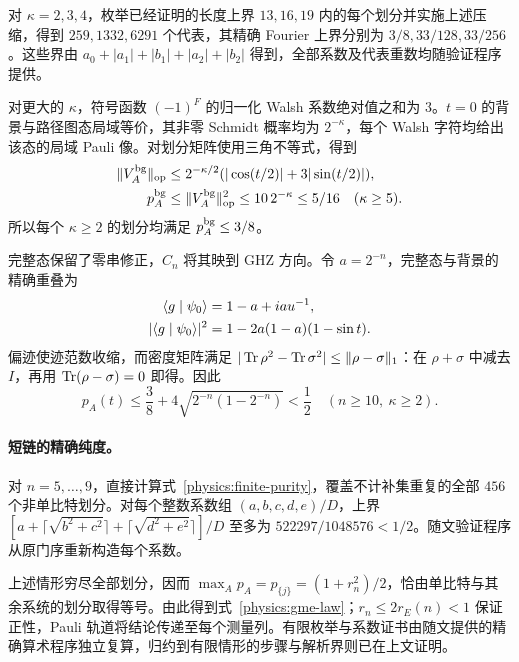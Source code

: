 对 $\kappa=2,3,4$，枚举已经证明的长度上界 $13,16,19$ 内的每个划分并实施上述压缩，得到 $259,1332,6291$ 个代表，其精确 Fourier 上界分别为 $3/8,33/128,33/256$。这些界由 $a_0+|a_1|+|b_1|+|a_2|+|b_2|$ 得到，全部系数及代表重数均随验证程序提供。

对更大的 $\kappa$，符号函数 $(-1)^F$ 的归一化 Walsh 系数绝对值之和为 $3$。$t=0$ 的背景与路径图态局域等价，其非零 Schmidt 概率均为 $2^{-\kappa}$，每个 Walsh 字符均给出该态的局域 Pauli 像。对划分矩阵使用三角不等式，得到
\begin{equation}
 \begin{aligned}
 \|V_A^{\rm bg}\|_{\rm op}
 &\le2^{-\kappa/2}(|\cos(t/2)|+3|\sin(t/2)|),\\
 p_A^{\rm bg}&\le\|V_A^{\rm bg}\|_{\rm op}^2
 \le10\,2^{-\kappa}\le5/16\quad(\kappa\ge5).
 \end{aligned}
 \label{physics:walsh-purity-bound}
\end{equation}
所以每个 $\kappa\ge2$ 的划分均满足 $p_A^{\rm bg}\le3/8$。

完整态保留了零串修正，$C_n$ 将其映到 GHZ 方向。令 $a=2^{-n}$，完整态与背景的精确重叠为
\begin{equation}
 \begin{aligned}
 \langle g\mid \psi_0\rangle&=1-a+iau^{-1},\\
 |\langle g\mid \psi_0\rangle|^2&=1-2a(1-a)(1-\sin t).
 \end{aligned}
 \label{physics:background-overlap}
\end{equation}
偏迹使迹范数收缩，而密度矩阵满足 $|\operatorname{Tr}\rho^2-\operatorname{Tr}\sigma^2|\le\|\rho-\sigma\|_1$：在 $\rho+\sigma$ 中减去 $I$，再用 $\operatorname{Tr}(\rho-\sigma)=0$ 即得。因此
\begin{equation}
 p_A(t)\le\frac38+4\sqrt{2^{-n}(1-2^{-n})}<\frac12
 \quad(n\ge10,\ \kappa\ge2).
 \label{physics:complete-purity-bound}
\end{equation}

\paragraph*{短链的精确纯度。}
对 $n=5,\ldots,9$，直接计算式~\eqref{physics:finite-purity}，覆盖不计补集重复的全部 $456$ 个非单比特划分。对每个整数系数组 $(a,b,c,d,e)/D$，上界 $[a+\lceil\sqrt{b^2+c^2}\rceil+\lceil\sqrt{d^2+e^2}\rceil]/D$ 至多为 $522297/1048576<1/2$。随文验证程序从原门序重新构造每个系数。

上述情形穷尽全部划分，因而 $\max_Ap_A=p_{\{j\}}=(1+r_n^2)/2$，恰由单比特与其余系统的划分取得等号。由此得到式~\eqref{physics:gme-law}；$r_n\le2r_E(n)<1$ 保证正性，Pauli 轨道将结论传递至每个测量列。有限枚举与系数证书由随文提供的精确算术程序独立复算，归约到有限情形的步骤与解析界则已在上文证明。

